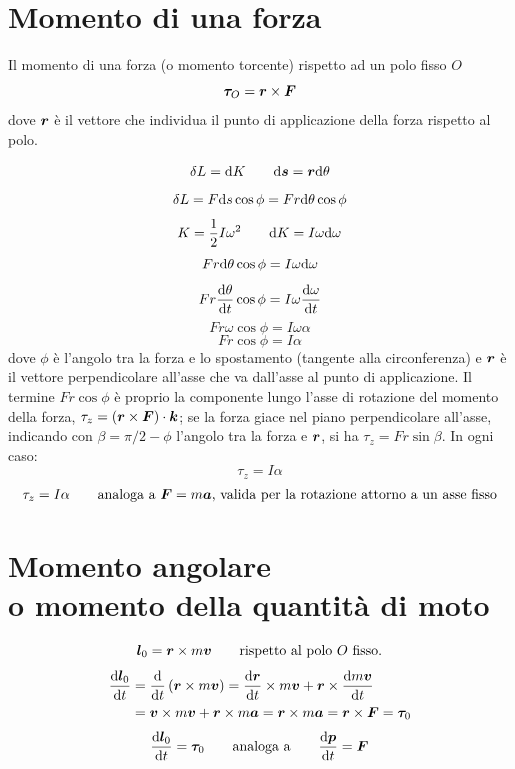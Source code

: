 \section{Momento di una forza}
\begin{Def}
  Il momento di una forza (o momento torcente) rispetto ad un polo fisso $O$
  \begin{equation}
    \boldsymbol{\tau}_O=\boldsymbol{r} \times \boldsymbol{F}
  \end{equation}
  dove $\boldsymbol{r}$ è il vettore che individua il punto di applicazione della forza rispetto al polo.
\end{Def}
\[\delta L=\mathrm{d} K\qquad \mathrm{d} \boldsymbol{s}=\boldsymbol{r}\mathrm{d} \theta\]
\[\delta L=F\mathrm{d} s\cos \phi=Fr\mathrm{d}\theta\cos\phi\]
\[K=\frac{1}{2}I\omega^2\qquad\mathrm{d} K=I\omega\mathrm{d}\omega\]
\[Fr\mathrm{d}\theta\cos\phi=I\omega\mathrm{d}\omega\]
\[Fr\frac{\mathrm{d}\theta}{\mathrm{d} t}\cos\phi=I\omega\frac{\mathrm{d}\omega}{\mathrm{d}
    t}\]
\[Fr\omega\cos\phi=I\omega\alpha\]
\[Fr\cos\phi=I\alpha\]
dove $\phi$ è l'angolo tra la forza e lo spostamento (tangente alla circonferenza) e $\boldsymbol{r}$ è il vettore perpendicolare all'asse che va dall'asse al punto di applicazione. Il termine $Fr\cos\phi$ è proprio la componente lungo l'asse di rotazione del momento della forza, $\tau_z=(\boldsymbol{r}\times\boldsymbol{F})\cdot\boldsymbol{k}$; se la forza giace nel piano perpendicolare all'asse, indicando con $\beta=\pi/2-\phi$ l'angolo tra la forza e $\boldsymbol{r}$, si ha $\tau_z=Fr\sin\beta$. In ogni caso:
\[\tau_z=I\alpha\]
\[\tau_z=I\alpha\qquad\text{analoga a $\boldsymbol{F}=m\boldsymbol{a}$, valida per la rotazione attorno a un asse fisso}\]
\section[\index{momento!angolare}\index{momento!della quantità di moto}Momento angolare o della quantità di moto]{Momento angolare\\ o momento della quantità di moto}
\[\boldsymbol{l}_0=\boldsymbol{r}\times m\boldsymbol{v}\qquad\text{rispetto al polo $O$ fisso.}\]
\begin{align*}
  \frac{\mathrm{d} \boldsymbol{l}_0}{\mathrm{d} t} & =\frac{\mathrm{d}}{\mathrm{d} t}\left(\boldsymbol{r}\times m\boldsymbol{v}\right)= \frac{\mathrm{d}\boldsymbol{r}}{\mathrm{d} t}\times m\boldsymbol{v}+\boldsymbol{r}\times\frac{\mathrm{d} m\boldsymbol{v}}{\mathrm{d} t} \\
                            & =\boldsymbol{v}\times m\boldsymbol{v}+\boldsymbol{r} \times m\boldsymbol{a}=\boldsymbol{r}\times m\boldsymbol{a}=\boldsymbol{r}\times\boldsymbol{F}=\boldsymbol{\tau}_0
\end{align*}
\[\frac{\mathrm{d}\boldsymbol{l}_0}{\mathrm{d} t}=\boldsymbol{\tau}_0\qquad\text{analoga
    a}\qquad\frac{\mathrm{d} \boldsymbol{p}}{\mathrm{d} t}=\boldsymbol{F}\]

